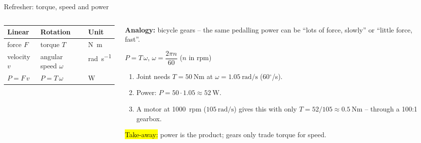 \documentclass[aspectratio=169,10pt]{beamer}
\begin{document}
\begin{frame}{Refresher: torque, speed and power}
\begin{columns}[T]
\begin{column}{.42\textwidth}
\centering
{}

\vspace{2mm}
\small
\renewcommand{\arraystretch}{1.1}
\begin{tabular}{@{}lll@{}}
\toprule
\textbf{Linear} & \textbf{Rotation} & \textbf{Unit}\\
\midrule
force $F$ & torque $T$ & \si{\newton\metre}\\
velocity $v$ & angular speed $\omega$ & \si{\radian\per\second}\\
$P=F\,v$ & $P=T\,\omega$ & \si{\watt}\\
\bottomrule
\end{tabular}
\end{column}
\begin{column}{.55\textwidth}
\small
\textbf{Analogy:} bicycle gears -- the same pedalling power can be ``lots of force, slowly'' or ``little force, fast''.
\begin{eqbox}
$P=T\,\omega$, \qquad $\omega=\dfrac{2\pi n}{60}$ \quad ($n$ in rpm)
\end{eqbox}
\begin{defbox}
\small
\begin{enumerate}\setlength\itemsep{1pt}
\item Joint needs $T=\SI{50}{\newton\metre}$ at $\omega=\SI{1.05}{\radian\per\second}$ (60$^\circ$/s).
\item Power: $P=50\cdot1.05\approx\SI{52}{\watt}$.
\item A motor at \SI{1000}{rpm} ($\SI{105}{\radian\per\second}$) gives this with only $T=52/105\approx\SI{0.5}{\newton\metre}$ -- through a 100:1 gearbox.
\end{enumerate}
\end{defbox}
\hl{Take-away:} power is the product; gears only trade torque for speed.
\end{column}
\end{columns}
\end{frame}
\end{document}
